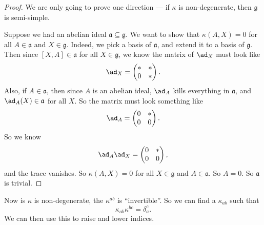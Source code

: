 \documentclass[a4paper]{article}
\begin{document}
\begin{proof}
  We are only going to prove one direction --- if $\kappa$ is non-degenerate, then $\mathfrak{g}$ is semi-simple.

  Suppose we had an abelian ideal $\mathfrak{a} \subseteq \mathfrak{g}$. We want to show that $\kappa(A, X) = 0$ for all $A \in \mathfrak{a}$ and $X \in \mathfrak{g}$. Indeed, we pick a basis of $\mathfrak{a}$, and extend it to a basis of $\mathfrak{g}$. Then since $[X, A] \in \mathfrak{a}$ for all $X \in \mathfrak{g}$, we know the matrix of $\ad_X$ must look like
  \[
    \ad_X =
    \begin{pmatrix}
      * & *\\
      0 & *
    \end{pmatrix}.
  \]
  Also, if $A \in \mathfrak{a}$, then since $A$ is an abelian ideal, $\ad_A$ kills everything in $\mathfrak{a}$, and $\ad_A(X) \in \mathfrak{a}$ for all $X$. So the matrix must look something like
  \[
    \ad_A =
    \begin{pmatrix}
      0 & *\\
      0 & 0
    \end{pmatrix}.
  \]
  So we know
  \[
    \ad_A \ad_X =
    \begin{pmatrix}
      0 & *\\
      0 & 0
    \end{pmatrix},
  \]
  and the trace vanishes. So $\kappa(A, X) = 0$ for all $X \in \mathfrak{g}$ and $A \in \mathfrak{a}$. So $A = 0$. So $\mathfrak{a}$ is trivial.
\end{proof}
Now is $\kappa$ is non-degenerate, the $\kappa^{ab}$ is ``invertible''. So we can find a $\kappa_{ab}$ such that
\[
  \kappa_{ab}\kappa^{bc} = \delta_a^c.
\]
We can then use this to raise and lower indices.

%
%
\end{document}
